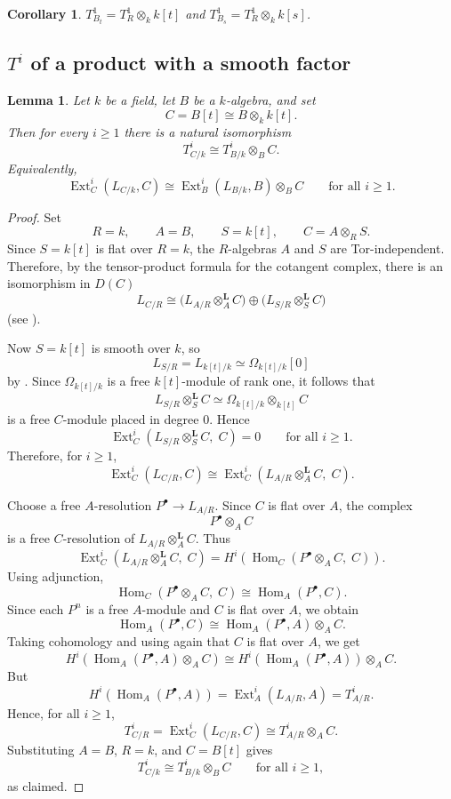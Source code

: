 \documentclass[11pt,twoside]{amsart}
\theoremstyle{plain}
\numberwithin{equation}{section}
\newtheorem{lemma}[theorem]{Lemma}
\newtheorem{corollary}[theorem]{Corollary}
\theoremstyle{definition}
\newcommand{\Ext}{\operatorname{Ext}}
\newcommand{\Hom}{\operatorname{Hom}}
\begin{document}
\begin{corollary}\label{cor:product}
$T^1_{B_t} = T^1_R \otimes_k k[t]$ and $T^1_{B_s} = T^1_R \otimes_k k[s]$.
\end{corollary}

\subsection{$T^i$ of a product with a smooth factor}
\begin{lemma}\label{lemma:cotangent-cohomology-polynomial-extension}
Let $k$ be a field, let $B$ be a $k$-algebra, and set
\[
C=B[t]\cong B\otimes_k k[t].
\]
Then for every $i\geq 1$ there is a natural isomorphism
\[
T^i_{C/k}\cong T^i_{B/k}\otimes_B C.
\]
Equivalently,
\[
\Ext^i_C(L_{C/k},C)\cong \Ext^i_B(L_{B/k},B)\otimes_B C
\qquad \text{for all } i\geq 1.
\]
\end{lemma}

\begin{proof}
Set
\[
R=k,\qquad A=B,\qquad S=k[t],\qquad C=A\otimes_R S.
\]
Since $S=k[t]$ is flat over $R=k$, the $R$-algebras $A$ and $S$ are Tor-independent. Therefore, by the tensor-product formula for the cotangent complex, there is an isomorphism in $D(C)$
\[
L_{C/R}\cong
\bigl(L_{A/R}\otimes_A^{\mathbf L} C\bigr)
\oplus
\bigl(L_{S/R}\otimes_S^{\mathbf L} C\bigr)
\]
(see \cite[\href{https://stacks.math.columbia.edu/tag/09DA}{Tag 09DA}]{StacksProject}).

Now $S=k[t]$ is smooth over $k$, so
\[
L_{S/R}=L_{k[t]/k}\simeq \Omega_{k[t]/k}[0]
\]
by \cite[\href{https://stacks.math.columbia.edu/tag/08R5}{Tag 08R5}]{StacksProject}.
Since $\Omega_{k[t]/k}$ is a free $k[t]$-module of rank one, it follows that
\[
L_{S/R}\otimes_S^{\mathbf L} C \simeq \Omega_{k[t]/k}\otimes_{k[t]} C
\]
is a free $C$-module placed in degree $0$. Hence
\[
\Ext^i_C\!\left(L_{S/R}\otimes_S^{\mathbf L} C,\; C\right)=0
\qquad \text{for all } i\geq 1.
\]
Therefore, for $i\geq 1$,
\[
\Ext^i_C(L_{C/R},C)\cong
\Ext^i_C\!\left(L_{A/R}\otimes_A^{\mathbf L} C,\; C\right).
\]

Choose a free $A$-resolution $P^\bullet\to L_{A/R}$. Since $C$ is flat over $A$, the complex
\[
P^\bullet\otimes_A C
\]
is a free $C$-resolution of $L_{A/R}\otimes_A^{\mathbf L} C$. Thus
\[
\Ext^i_C\!\left(L_{A/R}\otimes_A^{\mathbf L} C,\; C\right)
=
H^i\!\left(\Hom_C(P^\bullet\otimes_A C,\; C)\right).
\]
Using adjunction,
\[
\Hom_C(P^\bullet\otimes_A C,\; C)\cong \Hom_A(P^\bullet,C).
\]
Since each $P^n$ is a free $A$-module and $C$ is flat over $A$, we obtain
\[
\Hom_A(P^\bullet,C)\cong \Hom_A(P^\bullet,A)\otimes_A C.
\]
Taking cohomology and using again that $C$ is flat over $A$, we get
\[
H^i\!\left(\Hom_A(P^\bullet,A)\otimes_A C\right)
\cong
H^i\!\left(\Hom_A(P^\bullet,A)\right)\otimes_A C.
\]
But
\[
H^i\!\left(\Hom_A(P^\bullet,A)\right)
=
\Ext^i_A(L_{A/R},A)
=
T^i_{A/R}.
\]
Hence, for all $i\geq 1$,
\[
T^i_{C/R}
=
\Ext^i_C(L_{C/R},C)
\cong
T^i_{A/R}\otimes_A C.
\]
Substituting $A=B$, $R=k$, and $C=B[t]$ gives
\[
T^i_{C/k}\cong T^i_{B/k}\otimes_B C
\qquad \text{for all } i\geq 1,
\]
as claimed.
\end{proof}
 
\end{document}
